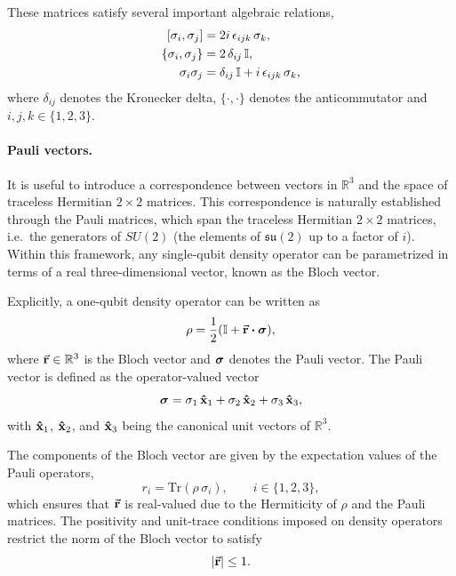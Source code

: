 These matrices satisfy several important algebraic relations,
\begin{align}
    \label{eq:pauli-prop1}
    [\sigma_i, \sigma_j]     & = 2i\, \epsilon_{ijk}\, \sigma_k,                    \\
    \label{eq:pauli-prop2}
    \{ \sigma_i, \sigma_j \} & = 2\, \delta_{ij}\, \mathbb{I},                             \\
    \label{eq:pauli-prop3}
    \sigma_i \sigma_j        & = \delta_{ij}\, \mathbb{I} + i\, \epsilon_{ijk}\, \sigma_k,
\end{align}
where $\delta_{ij}$ denotes the Kronecker delta, $\{\cdot,\cdot\}$ denotes the anticommutator and $i,j,k \in \{1,2,3\}$.

\paragraph{Pauli vectors.}
It is useful to introduce a correspondence between vectors in $\mathbb{R}^3$ and the space of traceless Hermitian $2 \times 2$ matrices. This correspondence is naturally established through the Pauli matrices, which span the traceless Hermitian $2\times 2$ matrices, i.e.\ the generators of $SU(2)$ (the elements of $\mathfrak{su}(2)$ up to a factor of $i$). Within this framework, any single-qubit density operator can be parametrized in terms of a real three-dimensional vector, known as the Bloch vector.

Explicitly, a one-qubit density operator can be written as
\begin{equation}
    \rho = \frac{1}{2}\qty(\id + \va{r} \vdot \vb*{\sigma}),
\end{equation}
where $\va{r} \in \mathbb{R}^3$ is the Bloch vector and $\vb*{\sigma}$ denotes the Pauli vector. The Pauli vector is defined as the operator-valued vector
\begin{equation}
    \vb*{\sigma} = \sigma_1\, \vu{x}_1 + \sigma_2\, \vu{x}_2 + \sigma_3\, \vu{x}_3,
\end{equation}
with $\vu{x}_1$, $\vu{x}_2$, and $\vu{x}_3$ being the canonical unit vectors of $\mathbb{R}^3$.

The components of the Bloch vector are given by the expectation values of the Pauli operators,
\begin{equation}
    r_i = \mathrm{Tr}(\rho\, \sigma_i), \qquad i \in \{1,2,3\},
\end{equation}
which ensures that $\va{r}$ is real-valued due to the Hermiticity of $\rho$ and the Pauli matrices. The positivity and unit-trace conditions imposed on density operators restrict the norm of the Bloch vector to satisfy
\begin{equation}
    \label{eq:bloch-condition}
    \qty| \va{r} | \leq 1.
\end{equation}

